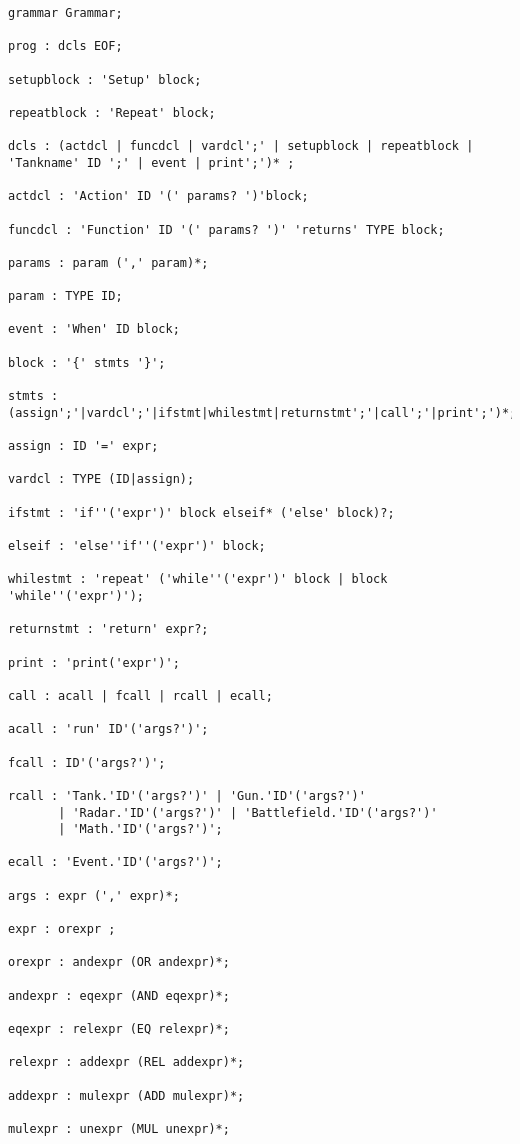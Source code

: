 \begin{lstlisting}[style=MyLang]
grammar Grammar;

prog : dcls EOF;

setupblock : 'Setup' block;

repeatblock : 'Repeat' block;

dcls : (actdcl | funcdcl | vardcl';' | setupblock | repeatblock | 'Tankname' ID ';' | event | print';')* ;

actdcl : 'Action' ID '(' params? ')'block;

funcdcl : 'Function' ID '(' params? ')' 'returns' TYPE block;

params : param (',' param)*;

param : TYPE ID;

event : 'When' ID block;

block : '{' stmts '}';

stmts : (assign';'|vardcl';'|ifstmt|whilestmt|returnstmt';'|call';'|print';')*;

assign : ID '=' expr;

vardcl : TYPE (ID|assign);

ifstmt : 'if''('expr')' block elseif* ('else' block)?;

elseif : 'else''if''('expr')' block;

whilestmt : 'repeat' ('while''('expr')' block | block 'while''('expr')');

returnstmt : 'return' expr?;

print : 'print('expr')';

call : acall | fcall | rcall | ecall;

acall : 'run' ID'('args?')';

fcall : ID'('args?')';

rcall : 'Tank.'ID'('args?')' | 'Gun.'ID'('args?')'
       | 'Radar.'ID'('args?')' | 'Battlefield.'ID'('args?')'
       | 'Math.'ID'('args?')';

ecall : 'Event.'ID'('args?')';

args : expr (',' expr)*;

expr : orexpr ;

orexpr : andexpr (OR andexpr)*;

andexpr : eqexpr (AND eqexpr)*;

eqexpr : relexpr (EQ relexpr)*;

relexpr : addexpr (REL addexpr)*;

addexpr : mulexpr (ADD mulexpr)*;

mulexpr : unexpr (MUL unexpr)*;


\end{lstlisting}
